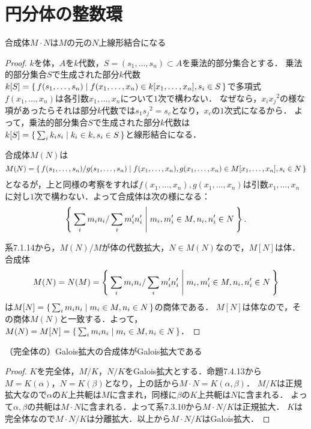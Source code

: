 \section{円分体の整数環}
\begin{screen} \label{composite_field}
  合成体$M \cdot N$は$M$の元の$N$上線形結合になる
\end{screen}
\begin{proof}
  $k$を体，$A$を$k$代数，$S = (s_1, \ldots, s_n) \subset A$を乗法的部分集合とする．
  乗法的部分集合$S$で生成された部分$k$代数$k[S] = \set{f(s_1, \ldots, s_n) \mid f(x_1, \ldots, x_n) \in k[x_1, \ldots, x_n], s_i \in S }$で多項式$f(x_1, \ldots, x_n)$は各引数$x_1, \ldots, x_n$について$1$次で構わない．
  なぜなら，$x_ix_j{}^2$の様な項があったらそれは部分$k$代数では$s_1s_j{}^2 = s_c$となり，$x_c$の$1$次式になるから．
  よって，乗法的部分集合$S$で生成された部分$k$代数は$k[S] = \set{ \sum_ik_is_i | k_i \in k, s_i \in S}$と線形結合になる．

  合成体$M(N)$は
  \[M(N) = \set{f(s_1, \ldots, s_n)/g(s_1, \ldots, s_n) \mid f(x_1, \ldots, x_n), g(x_1, \ldots, x_n) \in M[x_1, \ldots, x_n], s_i \in N} \]
  となるが，上と同様の考察をすれば$f(x_1, \ldots, x_n), g(x_1, \ldots, x_n)$は引数$x_1, \ldots, x_n$に対し$1$次で構わない．よって合成体は次の様になる：
  \[ \Set{ \sum_im_in_i/\sum_im'_in'_i | m_i, m'_i \in M, n_i, n'_i \in N}. \]

  系7.1.14から，$M(N)/M$が体の代数拡大，$N \in M(N)$なので，$M[N]$は体．合成体
  \[M(N) = N(M) = \Set{ \sum_im_in_i/\sum_im'_in'_i | m_i, m'_i \in M, n_i, n'_i \in N} \]
  は$M[N] = \set{ \sum_im_in_i| m_i \in M, n_i \in N}$の商体である．
  $M[N]$は体なので，その商体$M(N)$と一致する．よって，$M(N) = M[N] = \set{ \sum_im_in_i| m_i \in M, n_i \in N}$．
\end{proof}

\begin{screen} \label{composite_of_Galois}
  （完全体の）Galois拡大の合成体がGalois拡大である
\end{screen}
\begin{proof}
  $K$を完全体，$M/K$，$N/K$をGalois拡大とする．命題7.4.13から$M = K( \alpha)$，$N = K( \beta)$となり，上の話から$M \cdot N = K( \alpha, \beta)$．
  $M/K$は正規拡大なので$ \alpha$の$K$上共軛は$M$に含まれ，同様に$ \beta$の$K$上共軛は$N$に含まれる．
  よって$ \alpha, \beta$の共軛は$M \cdot N$に含まれる．よって系7.3.10から$M \cdot N/K$は正規拡大．
  $K$は完全体なので$M \cdot N/K$は分離拡大．以上から$M \cdot N/K$はGalois拡大．
\end{proof}


